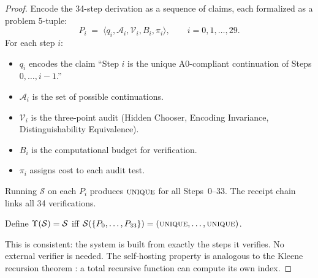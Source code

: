 \begin{proof}
Encode the 34-step derivation as a sequence of claims, each formalized as
a problem 5-tuple:
\[
  P_i \;=\; \langle q_i, \mathcal{A}_i, \mathcal{V}_i, B_i, \pi_i \rangle,
  \qquad i = 0, 1, \ldots, 29.
\]
For each step $i$:
\begin{itemize}[nosep]
  \item $q_i$ encodes the claim ``Step $i$ is the unique A0-compliant
        continuation of Steps $0, \ldots, i-1$.''
  \item $\mathcal{A}_i$ is the set of possible continuations.
  \item $\mathcal{V}_i$ is the three-point audit (Hidden Chooser,
        Encoding Invariance, Distinguishability Equivalence).
  \item $B_i$ is the computational budget for verification.
  \item $\pi_i$ assigns cost to each audit test.
\end{itemize}

Running $\mathcal{S}$ on each $P_i$ produces $\textsc{unique}$ for all
Steps~0--33.  The receipt chain
links all 34 verifications.

Define $\Upsilon(\mathcal{S}) = \mathcal{S}$ iff
$\mathcal{S}(\{P_0, \ldots, P_{33}\}) = (\textsc{unique}, \ldots, \textsc{unique})$.

This is consistent: the system is built from exactly the steps it verifies.
No external verifier is needed.  The self-hosting property is analogous to
the Kleene recursion theorem \citep{kleene1952}: a total recursive function
can compute its own index.

\end{proof}

